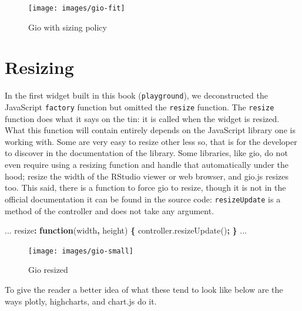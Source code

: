 \documentclass[
  10pt,
]{krantz}
\makeatletter
\newenvironment{Shaded}{\begin{snugshade}}{\end{snugshade}}
\newcommand{\AttributeTok}[1]{\textcolor[rgb]{0.61,0.61,0.61}{#1}}
\newcommand{\KeywordTok}[1]{\textcolor[rgb]{0.27,0.27,0.27}{\textbf{#1}}}
\newcommand{\NormalTok}[1]{#1}
\newcommand{\OperatorTok}[1]{\textcolor[rgb]{0.43,0.43,0.43}{\textbf{#1}}}
\newcommand{\VariableTok}[1]{\textcolor[rgb]{0,0,0}{#1}}
\newenvironment{kframe}{%
\medskip{}
\setlength{\fboxsep}{.8em}
 \def\at@end@of@kframe{}%
 \ifinner\ifhmode%
  \def\at@end@of@kframe{\end{minipage}}%
  \begin{minipage}{\columnwidth}%
 \fi\fi%
 \def\FrameCommand##1{\hskip\@totalleftmargin \hskip-\fboxsep
 \colorbox{shadecolor}{##1}\hskip-\fboxsep
     \hskip-\linewidth \hskip-\@totalleftmargin \hskip\columnwidth}%
 \MakeFramed {\advance\hsize-\width
   \@totalleftmargin\z@ \linewidth\hsize
   \@setminipage}}%
 {\par\unskip\endMakeFramed%
 \at@end@of@kframe}
\renewenvironment{Shaded}{\begin{kframe}}{\end{kframe}}
\makeatother
\begin{document}
\begin{figure}[H]

{\centering \texttt{[image: images/gio-fit]} 

}

\caption{Gio with sizing policy}\label{fig:gio-fit}
\end{figure}

\hypertarget{widgets-adv-resizing}{%
\section{Resizing}\label{widgets-adv-resizing}}

In the first widget built in this book (\texttt{playground}), we deconstructed the JavaScript \texttt{factory} function but omitted the \texttt{resize} function. The \texttt{resize} function does what it says on the tin: it is called when the widget is resized. What this function will contain entirely depends on the JavaScript library one is working with. Some are very easy to resize other less so, that is for the developer to discover in the documentation of the library. Some libraries, like gio, do not even require using a resizing function and handle that automatically under the hood; resize the width of the RStudio viewer or web browser, and gio.js resizes too. This said, there is a function to force gio to resize, though it is not in the official documentation it can be found in the source code: \texttt{resizeUpdate} is a method of the controller and does not take any argument.

\begin{Shaded}
\begin{Highlighting}[]
\NormalTok{...}
\NormalTok{resize}\OperatorTok{:} \KeywordTok{function}\NormalTok{(width}\OperatorTok{,}\NormalTok{ height) }\OperatorTok{\{}
  \VariableTok{controller}\NormalTok{.}\AttributeTok{resizeUpdate}\NormalTok{()}\OperatorTok{;}
\OperatorTok{\}}
\NormalTok{...}
\end{Highlighting}
\end{Shaded}

\begin{figure}[H]

{\centering \texttt{[image: images/gio-small]} 

}

\caption{Gio resized}\label{fig:gio-small}
\end{figure}

To give the reader a better idea of what these tend to look like below are the ways plotly, highcharts, and chart.js do it.
\end{document}
